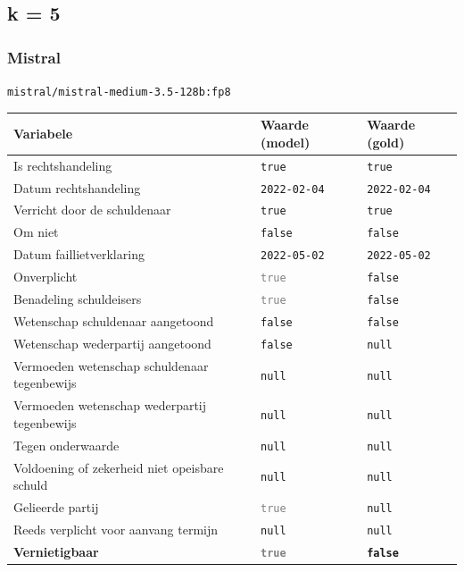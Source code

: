 \documentclass[
  dutch,
  a4paper,
]{article}
\begin{document}
\newpage


\subsection{k = 5}\label{k-5-1}

\subsubsection{Mistral}\label{mistral-4}

\texttt{mistral/mistral-medium-3.5-128b:fp8}

\begin{center}
\small
\begin{tabular}{@{}p{7.4cm}p{2.6cm}p{2.6cm}@{}}
\toprule
Variabele & Waarde (model) & Waarde (gold) \\
\midrule
Is rechtshandeling & \texttt{true} & \texttt{true} \\
Datum rechtshandeling & \texttt{2022-02-04} & \texttt{2022-02-04} \\
Verricht door de schuldenaar & \texttt{true} & \texttt{true} \\
Om niet & \texttt{false} & \texttt{false} \\
Datum faillietverklaring & \texttt{2022-05-02} & \texttt{2022-05-02} \\
Onverplicht & \textcolor{gray}{\texttt{true}} & \texttt{false} \\
Benadeling schuldeisers & \textcolor{gray}{\texttt{true}} & \texttt{false} \\
Wetenschap schuldenaar aangetoond & \texttt{false} & \texttt{false} \\
Wetenschap wederpartij aangetoond & \texttt{false} & \texttt{null} \\
Vermoeden wetenschap schuldenaar tegenbewijs & \texttt{null} & \texttt{null} \\
Vermoeden wetenschap wederpartij tegenbewijs & \texttt{null} & \texttt{null} \\
Tegen onderwaarde & \texttt{null} & \texttt{null} \\
Voldoening of zekerheid niet opeisbare schuld & \texttt{null} & \texttt{null} \\
Gelieerde partij & \textcolor{gray}{\texttt{true}} & \texttt{null} \\
Reeds verplicht voor aanvang termijn & \texttt{null} & \texttt{null} \\
\textbf{Vernietigbaar} & \textbf{\textcolor{gray}{\texttt{true}}} & \textbf{\texttt{false}} \\
\bottomrule
\end{tabular}
\end{center}
\end{document}
